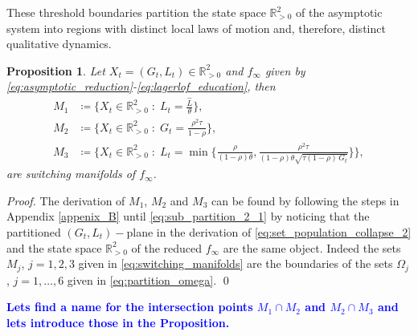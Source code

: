 \documentclass[a4paper,fleqn]{cas-sc}
\newtheorem{proposition}{Proposition}
\newcommand{\samb}[1]{\textcolor{blue}{\textbf{#1}}}
\begin{document}
These threshold boundaries partition the state space $\mathbb R^2_{>0}$ of the asymptotic system into regions with distinct local laws of motion and, therefore, distinct qualitative dynamics.
%
\begin{proposition}\label{prop:switching_manifolds}
    Let $X_t=(G_t,L_t)\in\mathbb{R}^2_{>0}$ and $f_{\infty}$ given by \eqref{eq:asymptotic_reduction}-\eqref{eq:lagerlof_education}, then
    \begin{subequations}\label{eq:switching_manifolds}
        \begin{align}
            M_1 &\coloneqq \bigg\{X_t\in\mathbb{R}^2_{>0}\;:\;L_t=\frac{\hat{L}}{\theta}\bigg\}, \label{eq:switching_manifold_1} \\
            M_2 &\coloneqq \bigg\{X_t\in\mathbb{R}^2_{>0}\;:\;G_t=\frac{\rho^2\tau}{1-\rho}\bigg\}, \label{eq:switching_manifold_2} \\
            M_3 &\coloneqq \Bigg\{X_t\in\mathbb{R}^2_{>0}\;:\;L_t=\min \bigg\{\frac{\rho}{(1-\rho)\theta},\frac{\rho^2\tau}{(1-\rho)\theta\sqrt{\tau(1-\rho)\,G_t}}\bigg\}\Bigg\}, \label{eq:switching_manifold_3}
        \end{align}
    \end{subequations}
    are switching manifolds of $f_{\infty}$.
\end{proposition}
%
\begin{proof}
    The derivation of $M_1$, $M_2$ and $M_3$ can be found by following the steps in Appendix \ref{appenix_B} until \eqref{eq:sub_partition_2_1} by noticing that the partitioned $(G_t,L_t)-$plane in the derivation of \eqref{eq:set_population_collapse_2} and the state space $\mathbb{R}^2_{>0}$ of the reduced $f_{\infty}$ are the same object. 
    Indeed the sets $M_{j}$, $j=1,2,3$ given in \eqref{eq:switching_manifolds} are the boundaries of the sets $\Omega_j$, $j=1,\dots,6$ given in \eqref{eq:partition_omega}. \qed
\end{proof}

\samb{Lets find a name for the intersection points $M_1\cap M_2$ and $M_2\cap M_3$ and lets introduce those in the Proposition. }
\end{document}
